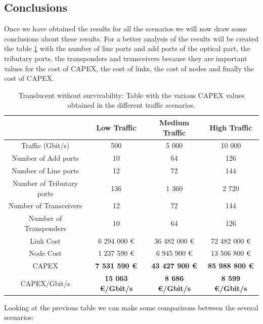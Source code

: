 \subsection{Conclusions}

Once we have obtained the results for all the scenarios we will now draw some conclusions about these results. For a better analysis of the results will be created the table \ref{table_comparative_transluc_surv} with the number of line ports and add ports of the optical part, the tributary ports, the transponders and transceivers because they are important values for the cost of CAPEX, the cost of links, the cost of nodes and finally the cost of CAPEX.

\newpage
\begin{table}[h!]
\centering
\begin{tabular}{| c | c | c | c |}
 \hline
  & Low Traffic & Medium Traffic  & High Traffic \\
 \hline\hline
 Traffic (Gbit/s) & 500 & 5 000 & 10 000 \\ \hline
 Number of Add ports & 10 & 64 & 126 \\ \hline
 Number of Line ports & 12 & 72 & 144 \\ \hline
 Number of Tributary ports & 136 & 1 360 & 2 720 \\ \hline
 Number of Transceivers & 12 & 72 & 144 \\ \hline
 Number of Transponders & 10 & 64 & 126 \\ \hline
 Link Cost & 6 294 000 \euro & 36 482 000 \euro & 72 482 000 \euro \\ \hline
 Node Cost & 1 237 590 \euro & 6 945 900 \euro & 13 506 800 \euro \\ \hline
 CAPEX & \textbf{7 531 590 \euro} & \textbf{43 427 900 \euro} & \textbf{85 988 800 \euro} \\ \hline
 CAPEX/Gbit/s & \textbf{15 063 \euro/Gbit/s} & \textbf{8 686 \euro/Gbit/s} & \textbf{8 599 \euro/Gbit/s}\\
 \hline
\end{tabular}
\caption{Translucent without survivability: Table with the various CAPEX values obtained in the different traffic scenarios.}
\label{table_comparative_transluc_surv}
\end{table}

Looking at the previous table we can make some comparisons between the several scenarios:

